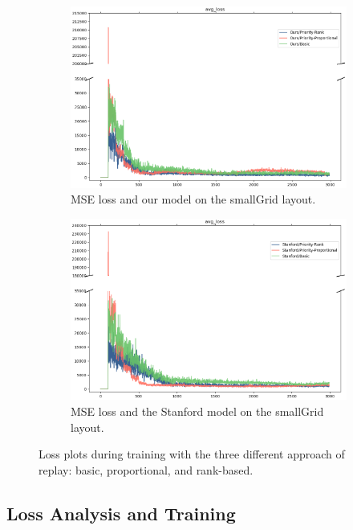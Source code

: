 \documentclass[conference]{IEEEtran}
\begin{document}
\begin{figure}
    \begin{subfigure}{.5\textwidth}
      \centering
      \includegraphics[width=.88\linewidth]{figures/small/training_smallgrid_mse_stanford.png}
      \caption{MSE loss and our model on the smallGrid layout.}
      \label{fig:train_our_mse}
    \end{subfigure}
    \begin{subfigure}{.5\textwidth}
      \centering
      \includegraphics[width=.88\linewidth]{figures/small/training_smallgrid_mse_small.png}
      \caption{MSE loss and the Stanford model on the smallGrid layout.}
      \label{fig:train_stanford_mse}
    \end{subfigure}
    \caption{Loss plots during training with the three different approach of replay: basic, proportional, and rank-based.}
    \label{fig:training}
\end{figure}

\subsection{Loss Analysis and Training}
\end{document}
